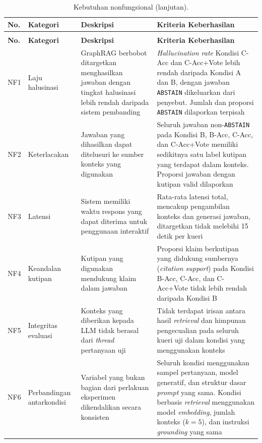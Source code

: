 \begingroup
\small
\setlength{\tabcolsep}{4pt}
\renewcommand{\arraystretch}{1.2}
\begin{longtable}{|>{\centering\arraybackslash}p{}|>{\raggedright\arraybackslash}p{}|>{\raggedright\arraybackslash}p{}|>{\raggedright\arraybackslash}p{}|}
\caption{Kebutuhan nonfungsional.}
\label{tab:kebutuhan-nonfungsional}\\
\hline
\textbf{No.} & \textbf{Kategori} & \textbf{Deskripsi} & \textbf{Kriteria Keberhasilan} \\
\hline
\endfirsthead
\caption[]{Kebutuhan nonfungsional (lanjutan).}\\
\hline
\textbf{No.} & \textbf{Kategori} & \textbf{Deskripsi} & \textbf{Kriteria Keberhasilan} \\
\hline
\endhead
\hline
\endfoot
NF1 & Laju halusinasi & GraphRAG berbobot ditargetkan menghasilkan jawaban dengan tingkat halusinasi lebih rendah daripada sistem pembanding & \emph{Hallucination rate} Kondisi C-Acc dan C-Acc+Vote lebih rendah daripada Kondisi A dan B, dengan jawaban \texttt{ABSTAIN} dikeluarkan dari penyebut. Jumlah dan proporsi \texttt{ABSTAIN} dilaporkan terpisah \\
\hline
NF2 & Keterlacakan & Jawaban yang dihasilkan dapat ditelusuri ke sumber konteks yang digunakan & Seluruh jawaban non-\texttt{ABSTAIN} pada Kondisi B, B-Acc, C-Acc, dan C-Acc+Vote memiliki sedikitnya satu label kutipan yang terdapat dalam konteks. Proporsi jawaban dengan kutipan valid dilaporkan \\
\hline
NF3 & Latensi & Sistem memiliki waktu respons yang dapat diterima untuk penggunaan interaktif & Rata-rata latensi total, mencakup pengambilan konteks dan generasi jawaban, ditargetkan tidak melebihi 15 detik per kueri \\
\hline
NF4 & Keandalan kutipan & Kutipan yang digunakan mendukung klaim dalam jawaban & Proporsi klaim berkutipan yang didukung sumbernya (\emph{citation support}) pada Kondisi B-Acc, C-Acc, dan C-Acc+Vote tidak lebih rendah daripada Kondisi B \\
\hline
NF5 & Integritas evaluasi & Konteks yang diberikan kepada LLM tidak berasal dari \emph{thread} pertanyaan uji & Tidak terdapat irisan antara hasil \emph{retrieval} dan himpunan pengecualian pada seluruh kueri uji dalam kondisi yang menggunakan konteks \\
\hline
NF6 & Perbandingan antarkondisi & Variabel yang bukan bagian dari perlakuan eksperimen dikendalikan secara konsisten & Seluruh kondisi menggunakan sampel pertanyaan, model generatif, dan struktur dasar \emph{prompt} yang sama. Kondisi berbasis \emph{retrieval} menggunakan model \emph{embedding}, jumlah konteks ($k=5$), dan instruksi \emph{grounding} yang sama \\
\hline
\end{longtable}
\endgroup